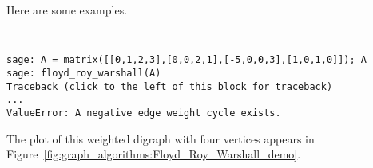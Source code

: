 Here are some examples.

%
%
%
%

%
%
%
%

\begin{center}
\fontsize{9pt}{9pt}
\selectfont
\tt
\begin{lstlisting}
sage: A = matrix([[0,1,2,3],[0,0,2,1],[-5,0,0,3],[1,0,1,0]]); A
sage: floyd_roy_warshall(A)
Traceback (click to the left of this block for traceback)
...
ValueError: A negative edge weight cycle exists.
\end{lstlisting}
\end{center}

The plot of this weighted digraph with four vertices appears in
Figure~\ref{fig:graph_algorithms:Floyd_Roy_Warshall_demo}.

